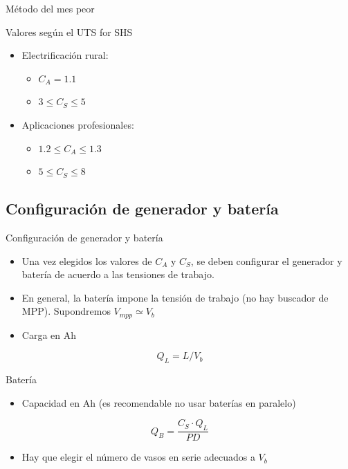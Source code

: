 \documentclass[xcolor={usenames,svgnames,dvipsnames}]{beamer}
\begin{document}
\begin{frame}[label={sec:orge079e9b}]{Método del mes peor}
\begin{block}{Valores según el UTS for SHS}
\begin{itemize}
\item Electrificación rural:

\begin{itemize}
\item \(C_{A}=1.1\)

\item \(3\leq C_{S}\leq5\)
\end{itemize}

\item Aplicaciones profesionales:

\begin{itemize}
\item \(1.2\leq C_{A}\leq1.3\)

\item \(5\leq C_{S}\leq8\)
\end{itemize}
\end{itemize}
\end{block}
\end{frame}

\subsection{Configuración de generador y batería}
\label{sec:org0989d62}
\begin{frame}[label={sec:org8b44350}]{Configuración de generador y batería}
\begin{itemize}
\item Una vez elegidos los valores de \(C_{A}\) y \(C_{S}\), se deben
configurar el generador y batería de acuerdo a las tensiones de
trabajo.

\item En general, la batería impone la tensión de trabajo (no hay buscador
de MPP). Supondremos \(V_{mpp} \simeq V_{b}\)

\item Carga en Ah
\end{itemize}
\[
Q_L = L / V_b
\]
\end{frame}

\begin{frame}[label={sec:orge0a3890}]{Batería}
\begin{itemize}
\item Capacidad en Ah (es recomendable no usar baterías en paralelo)
\end{itemize}
\[
Q_B = \frac{C_S \cdot Q_L}{PD}
\]

\begin{itemize}
\item Hay que elegir el número de vasos en serie adecuados a \(V_b\)
\end{itemize}
\end{frame}
\end{document}

